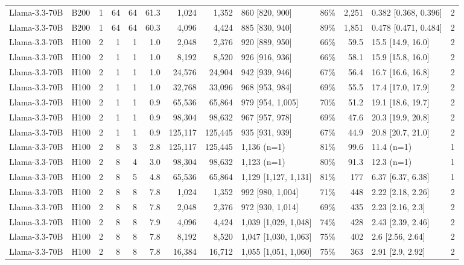 \begin{landscape}
\begin{longtable}{llrrrrrrlrrlr}
Llama-3.3-70B & B200 & 1 & 64 & 64 & 61.3 & 1,024 & 1,352 & 860 {[}820, 900{]} & 86\% & 2,251 & 0.382 {[}0.368, 0.396{]} & 2 \\
Llama-3.3-70B & B200 & 1 & 64 & 64 & 60.3 & 4,096 & 4,424 & 885 {[}830, 940{]} & 89\% & 1,851 & 0.478 {[}0.471, 0.484{]} & 2 \\
Llama-3.3-70B & H100 & 2 & 1 & 1 & 1.0 & 2,048 & 2,376 & 920 {[}889, 950{]} & 66\% & 59.5 & 15.5 {[}14.9, 16.0{]} & 2 \\
Llama-3.3-70B & H100 & 2 & 1 & 1 & 1.0 & 8,192 & 8,520 & 926 {[}916, 936{]} & 66\% & 58.1 & 15.9 {[}15.8, 16.0{]} & 2 \\
Llama-3.3-70B & H100 & 2 & 1 & 1 & 1.0 & 24,576 & 24,904 & 942 {[}939, 946{]} & 67\% & 56.4 & 16.7 {[}16.6, 16.8{]} & 2 \\
Llama-3.3-70B & H100 & 2 & 1 & 1 & 1.0 & 32,768 & 33,096 & 968 {[}953, 984{]} & 69\% & 55.5 & 17.4 {[}17.0, 17.9{]} & 2 \\
Llama-3.3-70B & H100 & 2 & 1 & 1 & 0.9 & 65,536 & 65,864 & 979 {[}954, 1,005{]} & 70\% & 51.2 & 19.1 {[}18.6, 19.7{]} & 2 \\
Llama-3.3-70B & H100 & 2 & 1 & 1 & 0.9 & 98,304 & 98,632 & 967 {[}957, 978{]} & 69\% & 47.6 & 20.3 {[}19.9, 20.8{]} & 2 \\
Llama-3.3-70B & H100 & 2 & 1 & 1 & 0.9 & 125,117 & 125,445 & 935 {[}931, 939{]} & 67\% & 44.9 & 20.8 {[}20.7, 21.0{]} & 2 \\
Llama-3.3-70B & H100 & 2 & 8 & 3 & 2.8 & 125,117 & 125,445 & 1,136 (n=1) & 81\% & 99.6 & 11.4 (n=1) & 1 \\
Llama-3.3-70B & H100 & 2 & 8 & 4 & 3.0 & 98,304 & 98,632 & 1,123 (n=1) & 80\% & 91.3 & 12.3 (n=1) & 1 \\
Llama-3.3-70B & H100 & 2 & 8 & 5 & 4.8 & 65,536 & 65,864 & 1,129 {[}1,127, 1,131{]} & 81\% & 177 & 6.37 {[}6.37, 6.38{]} & 1 \\
Llama-3.3-70B & H100 & 2 & 8 & 8 & 7.8 & 1,024 & 1,352 & 992 {[}980, 1,004{]} & 71\% & 448 & 2.22 {[}2.18, 2.26{]} & 2 \\
Llama-3.3-70B & H100 & 2 & 8 & 8 & 7.8 & 2,048 & 2,376 & 972 {[}930, 1,014{]} & 69\% & 435 & 2.23 {[}2.16, 2.3{]} & 2 \\
Llama-3.3-70B & H100 & 2 & 8 & 8 & 7.9 & 4,096 & 4,424 & 1,039 {[}1,029, 1,048{]} & 74\% & 428 & 2.43 {[}2.39, 2.46{]} & 2 \\
Llama-3.3-70B & H100 & 2 & 8 & 8 & 7.8 & 8,192 & 8,520 & 1,047 {[}1,030, 1,063{]} & 75\% & 402 & 2.6 {[}2.56, 2.64{]} & 2 \\
Llama-3.3-70B & H100 & 2 & 8 & 8 & 7.8 & 16,384 & 16,712 & 1,055 {[}1,051, 1,060{]} & 75\% & 363 & 2.91 {[}2.9, 2.92{]} & 2 \\

\end{longtable}
\end{landscape}
